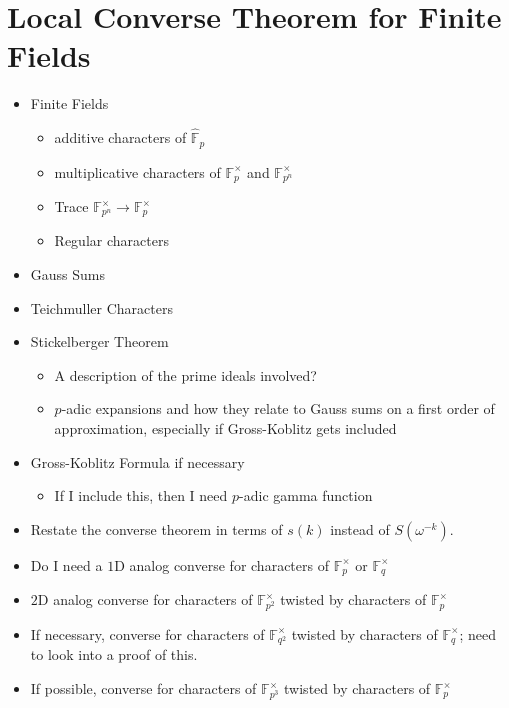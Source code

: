 \chapter{Local Converse Theorem for Finite Fields}	%
\begin{itemize}
\item Finite Fields 
\begin{itemize}
\item additive characters of $\hat{\mathbb{F}}_p$
\item multiplicative characters of $\mathbb{F}_p^\times$ and $\mathbb{F}_{p^n}^\times$
\item Trace $\mathbb{F}_{p^n}^\times \to \mathbb{F}_{p}^\times$
\item Regular characters
\end{itemize}
\item Gauss Sums 
\item Teichmuller Characters 
\item Stickelberger Theorem 
\begin{itemize}
\item A description of the prime ideals involved?
\item $p$-adic expansions and how they relate to Gauss sums on a first order of approximation, especially if Gross-Koblitz gets included
\end{itemize}
\item Gross-Koblitz Formula if necessary 
\begin{itemize}
\item If I include this, then I need $p$-adic gamma function
\end{itemize}
\item Restate the converse theorem in terms of $s(k)$ instead of $S(\omega^{-k})$.
\item Do I need a $1$D analog converse for characters of $\mathbb{F}_p^\times$ or $\mathbb{F}_q^\times$ 
\item $2$D analog converse for characters of $\mathbb{F}_{p^2}^\times$ twisted by characters of $\mathbb{F}_{p}^\times$ 
\item If necessary, converse for characters of $\mathbb{F}_{q^2}^\times$ twisted by characters of $\mathbb{F}_{q}^\times$; need to look into a proof of this.
\item If possible, converse for characters of $\mathbb{F}_{p^3}^\times$ twisted by characters of $\mathbb{F}_{p}^\times$ 
\end{itemize}
\endinput
